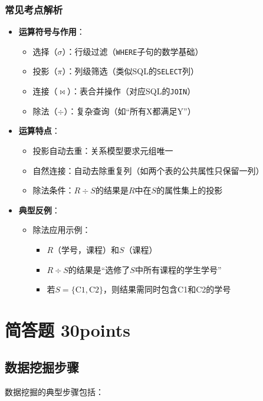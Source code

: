 \documentclass[a4paper,12pt,UTF8,fontset=none]{ctexart}
\begin{document}
\subsubsection{常见考点解析}
\begin{itemize}
    \item \textbf{运算符号与作用}：
    \begin{itemize}
        \item 选择（$\sigma$）：行级过滤（\texttt{WHERE}子句的数学基础）
        \item 投影（$\pi$）：列级筛选（类似SQL的\texttt{SELECT}列）
        \item 连接（$\Join$）：表合并操作（对应SQL的\texttt{JOIN}）
        \item 除法（$\div$）：复杂查询（如“所有X都满足Y”）
    \end{itemize}

    \item \textbf{运算特点}：
    \begin{itemize}
        \item 投影自动去重：关系模型要求元组唯一
        \item 自然连接：自动去除重复列（如两个表的公共属性只保留一列）
        \item 除法条件：$R \div S$的结果是$R$中在$S$的属性集上的投影
    \end{itemize}

    \item \textbf{典型反例}：
    \begin{itemize}
        \item 除法应用示例：
        \begin{itemize}
            \item $R$（学号，课程）和$S$（课程）
            \item $R \div S$的结果是“选修了$S$中所有课程的学生学号”
            \item 若$S=\{\text{C1},\text{C2}\}$，则结果需同时包含C1和C2的学号
        \end{itemize}
    \end{itemize}
\end{itemize}
\section{简答题 30points}
\subsection{数据挖掘步骤}
数据挖掘的典型步骤包括：
\end{document}
